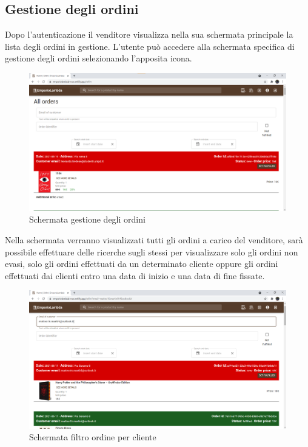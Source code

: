 \subsection{Gestione degli ordini}\label{OrdiniVenditore}
Dopo l'autenticazione il venditore visualizza nella sua schermata principale la lista degli ordini in gestione. L'utente può accedere alla schermata specifica di gestione degli ordini selezionando l'apposita icona.
\begin{figure}[H]
	\centering
	\includegraphics[scale=0.4]{Immagini/Venditore/Orders.png}
	\caption{Schermata gestione degli ordini}
	\label{fig:OrdiniVend}
\end{figure}
\newpage
Nella schermata verranno visualizzati tutti gli ordini a carico del venditore, sarà possibile effettuare delle ricerche sugli stessi per visualizzare solo gli ordini non evasi, solo gli ordini effettuati da un determinato cliente oppure gli ordini effettuati dai clienti entro una data di inizio e una data di fine fissate.
\begin{figure}[H]
	\centering
	\includegraphics[scale=0.4]{Immagini/Venditore/Orders Customer Filter.png}
	\caption{Schermata filtro ordine per cliente}
	\label{fig:OrdiniCliente}
\end{figure}
